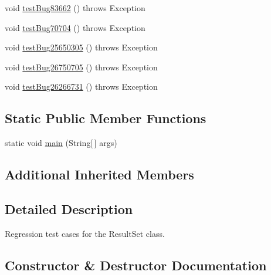 \begin{DoxyCompactItemize}
\item 
void \mbox{\hyperlink{classtestsuite_1_1regression_1_1_result_set_regression_test_a75450f04071c7d70db843360e616af67}{test\+Bug83662}} ()  throws Exception 
\item 
void \mbox{\hyperlink{classtestsuite_1_1regression_1_1_result_set_regression_test_adff3e595315840e31279f6e60ea8ae4c}{test\+Bug70704}} ()  throws Exception 
\item 
void \mbox{\hyperlink{classtestsuite_1_1regression_1_1_result_set_regression_test_a0f5956c737c57829a292e224381bffb6}{test\+Bug25650305}} ()  throws Exception 
\item 
void \mbox{\hyperlink{classtestsuite_1_1regression_1_1_result_set_regression_test_ab55112fe15585a967fd38cf93a88972b}{test\+Bug26750705}} ()  throws Exception 
\item 
void \mbox{\hyperlink{classtestsuite_1_1regression_1_1_result_set_regression_test_abdf1a89f884b877e115ff10663abd11a}{test\+Bug26266731}} ()  throws Exception 
\end{DoxyCompactItemize}
\subsection*{Static Public Member Functions}
\begin{DoxyCompactItemize}
\item 
static void \mbox{\hyperlink{classtestsuite_1_1regression_1_1_result_set_regression_test_a3ccb44f60c1c13e2fc475a453f25866f}{main}} (String\mbox{[}$\,$\mbox{]} args)
\end{DoxyCompactItemize}
\subsection*{Additional Inherited Members}


\subsection{Detailed Description}
Regression test cases for the Result\+Set class. 

\subsection{Constructor \& Destructor Documentation}
\mbox{\label{classtestsuite_1_1regression_1_1_result_set_regression_test_a5ca33c73ced6b3a694b444d75b08413b}} 
